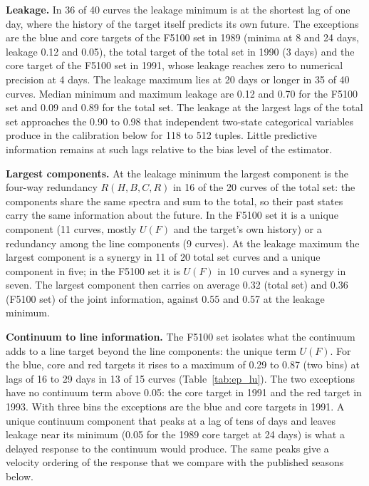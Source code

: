 \begin{SURDtable}
\centering
\caption{As Table~\ref{tab:ep_extrema_total} for the variable set F5100, blue, core and red
H$\beta$. F denotes the continuum.}
\label{tab:ep_extrema_cont}
\footnotesize
\setlength{\tabcolsep}{3pt}

\end{SURDtable}

\textbf{Leakage.} In 36 of 40 curves the leakage minimum is at the shortest lag of
one day, where the history of the target itself predicts its own future. The
exceptions are the blue and core targets of the F5100 set in 1989 (minima at 8 and
24 days, leakage 0.12 and 0.05), the total target of the total set in 1990 (3 days)
and the core target of the F5100 set in 1991, whose leakage reaches zero to numerical
precision at 4 days. The leakage maximum lies at 20 days or longer in 35 of 40
curves. Median minimum and maximum leakage are 0.12 and 0.70 for the F5100 set and
0.09 and 0.89 for the total set. The leakage at the largest lags of the total set
approaches the 0.90 to 0.98 that independent two-state categorical variables produce in the
calibration below for 118 to 512 tuples. Little predictive information remains at
such lags relative to the bias level of the estimator.

\textbf{Largest components.} At the leakage minimum the largest component is the
four-way redundancy $R(H,B,C,R)$ in 16 of the 20 curves of the total set: the
components share the same spectra and sum to the total, so their past states carry
the same information about the future. In the F5100 set it is a unique component
(11 curves, mostly $U(F)$ and the target's own history) or a redundancy among the
line components (9 curves). At the leakage maximum the largest component is a
synergy in 11 of 20 total set curves and a unique component in five; in the F5100 set
it is $U(F)$ in 10 curves and a synergy in seven. The largest component then carries
on average 0.32 (total set) and 0.36 (F5100 set) of the joint information, against
0.55 and 0.57 at the leakage minimum.

\textbf{Continuum to line information.} The F5100 set isolates what the continuum
adds to a line target beyond the line components: the unique term $U(F)$. For the
blue, core and red targets it rises to a maximum of 0.29 to 0.87 (two bins) at lags
of 16 to 29 days in 13 of 15 curves (Table~\ref{tab:ep_lu}). The two exceptions
have no continuum term above 0.05: the core target in 1991 and the red target in
1993. With three bins the exceptions are the blue and core targets in 1991. A unique continuum component that
peaks at a lag of tens of days and leaves leakage near its minimum (0.05 for the
1989 core target at 24 days) is what a delayed response to the continuum would
produce. The same peaks give a velocity ordering of the response that we compare
with the published seasons below.

